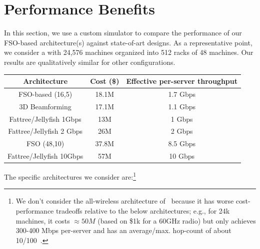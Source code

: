 \section{Performance Benefits}
\label{sec:perf}

In this section, we use a custom simulator to compare the
performance of our FSO-based architecture(s) against state-of-art  \DC
designs.   As a representative point, we consider a \DC with 24,576
machines organized into 512 racks of 48 machines. Our results are
qualitatively similar for other configurations.


\begin{table}[t]
\begin{small}
\begin{center}
\begin{tabular}{c|c|c}
Architecture & Cost (\$) & Effective per-server throughput \\   \hline %
FSO-based (16,5) & 18.1M  & 1.7 Gbps\\    %
3D Beamforming & 17.1M  & 1.1 Gbps\\%
Fattree/Jellyfish 1Gbps & 13M & 1 Gbps\\%
Fattree/Jellyfish 2 Gbps & 26M  & 2 Gbps \\ \hline
FSO (48,10) & 37.8M  & 8.5 Gbps \\ %
Fattree/Jellyfish 10Gbps & 57M  & 10 Gbps%
\end{tabular}
\end{center}
\end{small}
\vspace{-0.3cm}
\vspace{-0.3cm}
\label{table:cost}
\end{table}

 The specific architectures we consider 
are:\footnote{We don't consider the all-wireless architecture
of~\cite{cornell} because  it has
worse cost-performance tradeoffs relative to the below
architectures; e.g., for 24k machines, it costs $\approx 50M$ (based on \$1k for a 60GHz radio) 
but only achieves 300-400 Mbps per-server and has an
average/max. hop-count of about 10/100~\cite{cornell}.}

